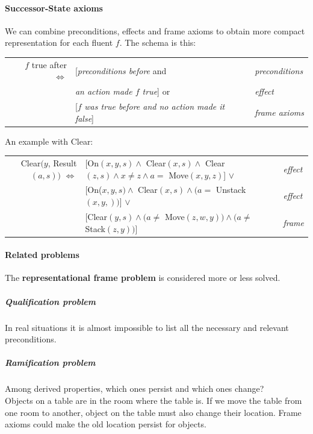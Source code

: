 \documentclass[10pt]{report}
\begin{document}
\paragraph{Successor-State axioms} We can combine preconditions, effects and frame axioms to obtain more compact representation for each fluent $f$. The schema is this:\begin{center}
\begin{tabular}{r l l}
$f$ true after $\Leftrightarrow$ & [\textit{preconditions before} and & \textit{preconditions}\\
& \textit{an action made $f$ true}] or & \textit{effect}\\
& [$f$ \textit{was true before and no action made it false}] & \textit{frame axioms}
\end{tabular}
\end{center}
An example with Clear:\begin{center}
\begin{tabular}{r l l}
Clear$(y$, Result$(a,s))$ $\Leftrightarrow$ & [On$(x,y,s)\wedge$ Clear$(x,s)\wedge$ Clear$(z,s)\wedge x\neq z \wedge a =$ Move$(x,y,z)$] $\vee$ & \textit{effect}\\
& [On($x,y,s)\wedge$ Clear$(x,s)\wedge(a =$ Unstack$(x,y,))$] $\vee$ & \textit{effect}\\
& [Clear$(y,s)\wedge(a\neq$ Move$(z,w,y))\wedge(a\neq$ Stack$(z,y))$] & \textit{frame}
\end{tabular}
\end{center}
\paragraph{Related problems} The \textbf{representational frame problem} is considered more or less solved.
\subparagraph{Qualification problem} In real situations it is almost impossible to list all the necessary and relevant preconditions.
\subparagraph{Ramification problem} Among derived properties, which ones persist and which ones change?\\
Objects on a table are in the room where the table is. If we move the table from one room to another, object on the table must also change their location. Frame axioms could make the old location persist for objects.
\end{document}
